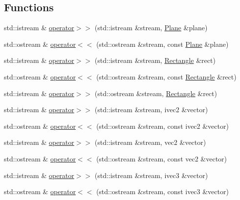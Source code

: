 \subsection*{Functions}
\begin{DoxyCompactItemize}
\item 
std\+::istream \& \hyperlink{namespace_agmd_maths_a108c88e13e976febc04be0d78b4e2bed}{operator$>$$>$} (std\+::istream \&stream, \hyperlink{class_agmd_maths_1_1_plane}{Plane} \&plane)
\item 
std\+::ostream \& \hyperlink{namespace_agmd_maths_a9f39f5d2243dde750c9bce77859283fd}{operator$<$$<$} (std\+::ostream \&stream, const \hyperlink{class_agmd_maths_1_1_plane}{Plane} \&plane)
\item 
std\+::istream \& \hyperlink{namespace_agmd_maths_a568cb632726434dcce24b6d93c59412c}{operator$>$$>$} (std\+::istream \&stream, \hyperlink{class_agmd_maths_1_1_rectangle}{Rectangle} \&rect)
\item 
std\+::ostream \& \hyperlink{namespace_agmd_maths_a96db1412f66516433f5a6890570969f8}{operator$<$$<$} (std\+::ostream \&stream, const \hyperlink{class_agmd_maths_1_1_rectangle}{Rectangle} \&rect)
\item 
std\+::istream \& \hyperlink{namespace_agmd_maths_ad2fd1e0ad57e5799b28bb421153400f5}{operator$>$$>$} (std\+::ostream \&stream, \hyperlink{class_agmd_maths_1_1_rectangle}{Rectangle} \&rect)
\item 
std\+::istream \& \hyperlink{namespace_agmd_maths_ae7139a4c81caf2c052480df322337b43}{operator$>$$>$} (std\+::istream \&stream, ivec2 \&vector)
\item 
std\+::ostream \& \hyperlink{namespace_agmd_maths_af0face5b912f1caa647e1b666d2bcaf2}{operator$<$$<$} (std\+::ostream \&stream, const ivec2 \&vector)
\item 
std\+::istream \& \hyperlink{namespace_agmd_maths_a5afdc6ac423834870d930e56d159307d}{operator$>$$>$} (std\+::istream \&stream, vec2 \&vector)
\item 
std\+::ostream \& \hyperlink{namespace_agmd_maths_a4b9828399f798ba0f2f9ff68f3969871}{operator$<$$<$} (std\+::ostream \&stream, const vec2 \&vector)
\item 
std\+::istream \& \hyperlink{namespace_agmd_maths_ab234769ff63512b42dbe93b1a3a47ebc}{operator$>$$>$} (std\+::istream \&stream, ivec3 \&vector)
\item 
std\+::ostream \& \hyperlink{namespace_agmd_maths_a0dca2168cda6a833600fbb48cb73a1e3}{operator$<$$<$} (std\+::ostream \&stream, const ivec3 \&vector)
\item 

\end{DoxyCompactItemize}
